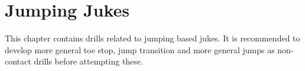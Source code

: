 \section{Jumping Jukes}
\label{sec:jammer_movement/jumping_jukes}

This chapter contains drills related to jumping based jukes.
It is recommended to develop more general toe stop, jump transition and more general jumps as non-contact drills before attempting these.
